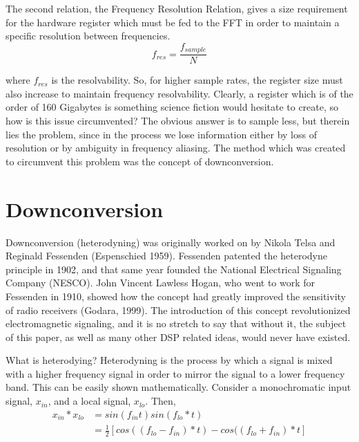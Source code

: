 \documentclass{report}
\begin{document}
The second relation, the Frequency Resolution Relation, gives a size requirement for the hardware register which must be fed to the FFT in order to maintain a specific resolution between frequencies.
\begin{equation}
f_{res} = \frac{f_{sample}}{N}
\end{equation}

where $f_{res}$ is the resolvability.  So, for higher sample rates, the register size must also increase to maintain frequency resolvability.  Clearly, a register which is of the order of 160 Gigabytes is something science fiction would hesitate to create, so how is this issue circumvented? The obvious answer is to sample less, but therein lies the problem, since in the process we lose information either by loss of resolution or by ambiguity in frequency aliasing.  The method which was created to circumvent this problem was the concept of downconversion.

\section{Downconversion}

Downconversion (heterodyning) was originally worked on by Nikola Telsa and Reginald Fessenden (Espenschied 1959).  Fessenden patented the heterodyne principle in 1902, and that same year founded the National Electrical Signaling Company (NESCO).  John Vincent Lawless Hogan, who went to work for Fessenden in 1910, showed how the concept had greatly improved the sensitivity of radio receivers (Godara, 1999).  The introduction of this concept revolutionized electromagnetic signaling, and it is no stretch to say that without it, the subject of this paper, as well as many other DSP related ideas, would never have existed.

What is heterodying? Heterodyning is the process by which a signal is mixed with a higher frequency signal in order to mirror the signal to a lower frequency band.  This can be easily shown mathematically.  Consider a monochromatic input signal, $x_{in}$, and a local signal, $x_{lo}$.  Then,
\begin{align}
x_{in}*x_{lo}& = sin(f_{in}t)sin(f_{lo}*t)\\
             & = \frac{1}{2}[cos((f_{lo}-f_{in})*t) - cos((f_{lo}+f_{in})*t]
\end{align}
\end{document}
